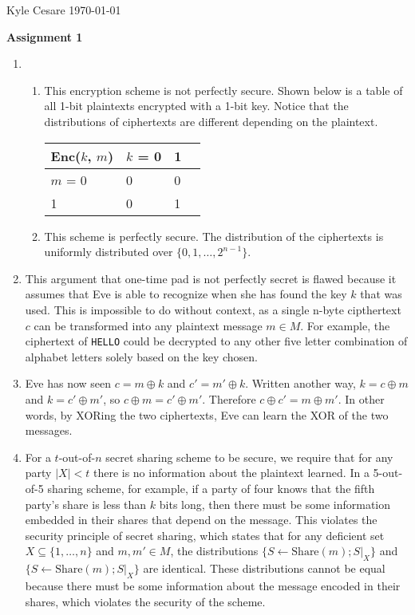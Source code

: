 \documentclass[12pt,letterpaper]{article}
\begin{document}
Kyle Cesare \hfill
\today \hfill

{\center\textbf{Assignment 1} \\}

\begin{enumerate}
  \item \begin{enumerate}
    \item This encryption scheme is not perfectly secure. Shown below is a table
      of all 1-bit plaintexts encrypted with a 1-bit key. Notice that the
      distributions of ciphertexts are different depending on the plaintext. \\
      \begin{tabular}{ l | l l l }
        Enc($k$, $m$) & $k$ = 0 & 1 \\ \hline
        $m$ = 0       &       0 & 0 \\
              1       &       0 & 1 \\
      \end{tabular}
    \item This scheme is perfectly secure. The distribution of the ciphertexts
      is uniformly distributed over $\{ 0, 1, \ldots, 2^{n-1} \}$.
  \end{enumerate}

  \item This argument that one-time pad is not perfectly secret is flawed
    because it assumes that Eve is able to recognize when she has found the key
    $k$ that was used. This is impossible to do without context, as a single
    n-byte cipthertext $c$ can be transformed into any plaintext message $m \in
    M$. For example, the ciphertext of \texttt{HELLO} could be decrypted to any
    other five letter combination of alphabet letters solely based on the key
    chosen.

  \item Eve has now seen $c = m \oplus k$ and $c' = m' \oplus k$. Written
    another way, $k = c \oplus m$ and $k = c' \oplus m'$, so $c \oplus m = c'
    \oplus m'$. Therefore $c \oplus c' = m \oplus m'$. In other words, by XORing
    the two ciphertexts, Eve can learn the XOR of the two messages.

  \item For a $t$-out-of-$n$ secret sharing scheme to be secure, we require that
    for any party $|X| < t$ there is no information about the plaintext learned.
    In a 5-out-of-5 sharing scheme, for example, if a party of four knows that
    the fifth party's share is less than $k$ bits long, then there must be some
    information embedded in their shares that depend on the message. This
    violates the security principle of secret sharing, which states that for any
    deficient set $X \subseteq \{ 1, \ldots, n \}$ and $m, m' \in M$, the
    distributions $\{ S \gets \mbox{Share}(m); S|_X \}$ and $\{ S \gets
    \mbox{Share}(m); S|_X \}$ are identical. These distributions cannot be equal
    because there must be some information about the message encoded in their
    shares, which violates the security of the scheme.


\end{enumerate}
\end{document}
